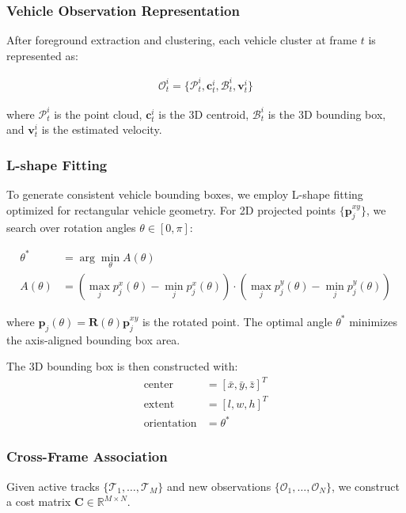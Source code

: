 \documentclass[numbered]{trbunofficial}
\begin{document}
\subsubsection{Vehicle Observation Representation}

After foreground extraction and clustering, each vehicle cluster at frame $t$ is represented as:

\begin{align}
  \mathcal{O}_t^i = \{\mathcal{P}_t^i, \mathbf{c}_t^i, \mathcal{B}_t^i, \mathbf{v}_t^i\}
\end{align}

where $\mathcal{P}_t^i$ is the point cloud, $\mathbf{c}_t^i$ is the 3D centroid, $\mathcal{B}_t^i$ is the 3D bounding box, and $\mathbf{v}_t^i$ is the estimated velocity.

\subsubsection{L-shape Fitting}

To generate consistent vehicle bounding boxes, we employ L-shape fitting optimized for rectangular vehicle geometry. For 2D projected points $\{\mathbf{p}_j^{xy}\}$, we search over rotation angles $\theta \in [0, \pi]$:

\begin{align}
  \theta^* &= \arg\min_{\theta} A(\theta) \\
  A(\theta) &= (\max_j p_j^x(\theta) - \min_j p_j^x(\theta)) \cdot (\max_j p_j^y(\theta) - \min_j p_j^y(\theta))
\end{align}

where $\mathbf{p}_j(\theta) = \mathbf{R}(\theta) \mathbf{p}_j^{xy}$ is the rotated point. The optimal angle $\theta^*$ minimizes the axis-aligned bounding box area.

The 3D bounding box is then constructed with:
\begin{align}
  \text{center} &= [\bar{x}, \bar{y}, \bar{z}]^T \\
  \text{extent} &= [l, w, h]^T \\
  \text{orientation} &= \theta^*
\end{align}

\subsubsection{Cross-Frame Association}

Given active tracks $\{\mathcal{T}_1, \ldots, \mathcal{T}_M\}$ and new observations $\{\mathcal{O}_1, \ldots, \mathcal{O}_N\}$, we construct a cost matrix $\mathbf{C} \in \mathbb{R}^{M \times N}$.
\end{document}
